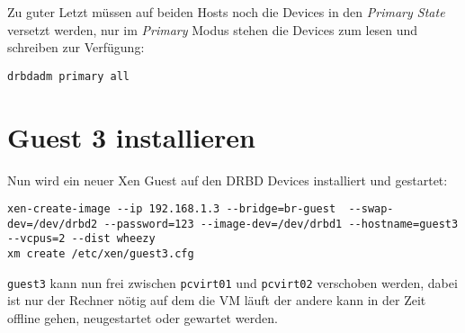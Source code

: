 Zu guter Letzt müssen auf beiden Hosts noch die Devices in den \emph{Primary State} versetzt werden, nur im \emph{Primary} Modus stehen die Devices zum lesen und schreiben zur Verfügung:
\setupVerbatimOut
\begin{verbatim}
drbdadm primary all
\end{verbatim}

\section{Guest 3 installieren}
Nun wird ein neuer Xen Guest auf den DRBD Devices installiert und gestartet:
\setupVerbatimOut
\begin{verbatim}
xen-create-image --ip 192.168.1.3 --bridge=br-guest  --swap-dev=/dev/drbd2 --password=123 --image-dev=/dev/drbd1 --hostname=guest3 --vcpus=2 --dist wheezy
xm create /etc/xen/guest3.cfg
\end{verbatim}

\verb|guest3| kann nun frei zwischen \verb#pcvirt01# und \verb#pcvirt02# verschoben werden, dabei ist nur der Rechner nötig auf dem die VM läuft der andere kann in der Zeit offline gehen, neugestartet oder gewartet werden.

